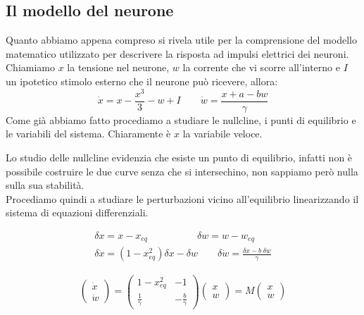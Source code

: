 \subsection{Il modello del neurone}

Quanto abbiamo appena compreso si rivela utile per la comprensione del modello matematico utilizzato per descrivere la risposta ad impulsi elettrici dei neuroni. Chiamiamo $x$ la tensione nel neurone, $w$ la corrente che vi scorre all'interno e $I$ un ipotetico stimolo esterno che il neurone può ricevere, allora:
\begin{equation}
		\dot{x}=x-\frac{x^3}{3}-w+I \qquad
		\dot{w}=\frac{x+a-bw}{\gamma}
\end{equation} 
Come già abbiamo fatto procediamo a studiare le nullcline, i punti di equilibrio e le variabili del sistema. Chiaramente è $x$ la variabile veloce.
\begin{multicols}{2}
	\begin{center}
	\end{center}

    Lo studio delle nullcline evidenzia che esiste un punto di equilibrio, infatti non è possibile costruire le due curve senza che si intersechino, non sappiamo però nulla sulla sua stabilità. \\
    
    Procediamo quindi a studiare le perturbazioni vicino all'equilibrio linearizzando il sistema di equazioni differenziali.
\end{multicols}
\begin{multicols}{2}
\begin{align*}
	\delta x=x-x_{eq} \qquad \qquad \quad \delta w=w-w_{eq}\\
	\delta \dot{x}=(1-x^2_{eq})\delta x-\delta w \qquad \delta \dot{w}=\frac{\delta x -b\ \delta w}{\gamma}
\end{align*}
\begin{align*}
	\\\\
	\begin{pmatrix}
		\dot{x} \\
		\dot{w}
	\end{pmatrix}
	=
	\begin{pmatrix}
		1-x_{eq}^2 & -1 \\
		\frac{1}{\gamma} & -\frac{b}{\gamma}
	\end{pmatrix}
	\begin{pmatrix}
		x \\
		w
	\end{pmatrix}
=
M\begin{pmatrix}
	x \\
	w
\end{pmatrix}
\end{align*}
\end{multicols}
